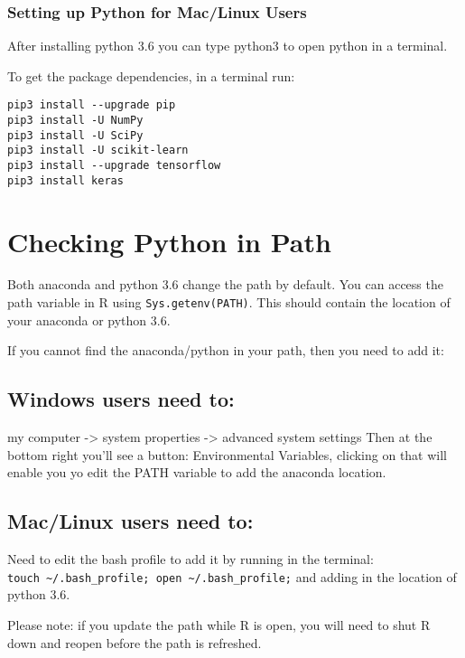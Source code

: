 \documentclass[]{article}
\begin{document}
\subsubsection{Setting up Python for Mac/Linux
Users}\label{setting-up-python-for-maclinux-users}

After installing python 3.6 you can type python3 to open python in a
terminal.

To get the package dependencies, in a terminal run:

\begin{verbatim}
pip3 install --upgrade pip
pip3 install -U NumPy
pip3 install -U SciPy 
pip3 install -U scikit-learn
pip3 install --upgrade tensorflow 
pip3 install keras
\end{verbatim}

\section{Checking Python in Path}\label{checking-python-in-path}

Both anaconda and python 3.6 change the path by default. You can access
the path variable in R using
\texttt{Sys.getenv(\textquotesingle{}PATH\textquotesingle{})}. This
should contain the location of your anaconda or python 3.6.

If you cannot find the anaconda/python in your path, then you need to
add it:

\subsection{Windows users need to:}\label{windows-users-need-to}

my computer -\textgreater{} system properties -\textgreater{} advanced
system settings Then at the bottom right you'll see a button:
Environmental Variables, clicking on that will enable you yo edit the
PATH variable to add the anaconda location.

\subsection{Mac/Linux users need to:}\label{maclinux-users-need-to}

Need to edit the bash profile to add it by running in the terminal:
\texttt{touch\ \textasciitilde{}/.bash\_profile;\ open\ \textasciitilde{}/.bash\_profile;}
and adding in the location of python 3.6.

Please note: if you update the path while R is open, you will need to
shut R down and reopen before the path is refreshed.
\end{document}

